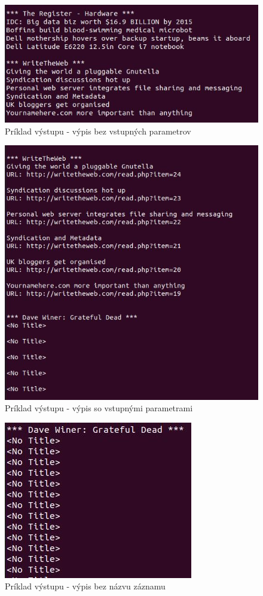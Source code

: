 \documentclass[a4paper, 11pt]{article}
\begin{document}
    \begin{figure}[h]
        \centering
        \includegraphics[width=0.4\linewidth]{img/without_params.JPG}
        \caption{Príklad výstupu - výpis bez vstupných parametrov}
        \label{without_params}   
    \end{figure}

    \begin{figure}[H]
        \centering
        \includegraphics[width=0.4\linewidth]{img/w_params.JPG}
        \caption{Príklad výstupu - výpis so vstupnými parametrami}
        \label{w_params}
    \end{figure}

    \begin{figure}[h]
        \centering
        \includegraphics[width=0.4\linewidth]{img/without_title.JPG}
        \caption{Príklad výstupu - výpis bez názvu záznamu}
        \label{without_title}
    \end{figure}
\end{document}
